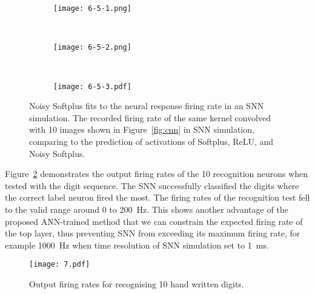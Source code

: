 \documentclass[runningheads,a4paper]{llncs}
\begin{document}
\begin{figure}[tbh!]
	\centering
	\begin{subfigure}[t]{0.6\textwidth}
		\texttt{[image: 6-5-1.png]}
	\end{subfigure}\\
	\begin{subfigure}[t]{0.6\textwidth}
		\texttt{[image: 6-5-2.png]}
	\end{subfigure}\\
	\begin{subfigure}[t]{0.6\textwidth}
		\texttt{[image: 6-5-3.pdf]}
	\end{subfigure}
	\caption{
		Noisy Softplus fits to the neural response firing rate in an SNN simulation.
		The recorded firing rate of the same kernel convolved with 10 images shown in Figure~\ref{fig:cnn} in SNN simulation, comparing to the prediction of activations of Softplus, ReLU, and Noisy Softplus.}
	\label{fig:af_compare}
\end{figure}

Figure~\ref{Fig:out} demonstrates the output firing rates of the 10 recognition neurons when tested with the digit sequence.
The SNN successfully classified the digits where the correct label neuron fired the most.
The firing rates of the recognition test fell to the valid range around 0 to 200~Hz.
This shows another advantage of the proposed ANN-trained method that we can constrain the expected firing rate of the top layer, thus preventing SNN from exceeding its maximum firing rate, for example 1000~Hz when time resolution of SNN simulation set to 1~ms.

\begin{figure}[tbp!]
	\centering
	\texttt{[image: 7.pdf]}
	\caption{Output firing rates for recognising 10 hand written digits.}
	\label{Fig:out}
\end{figure}
\end{document}
